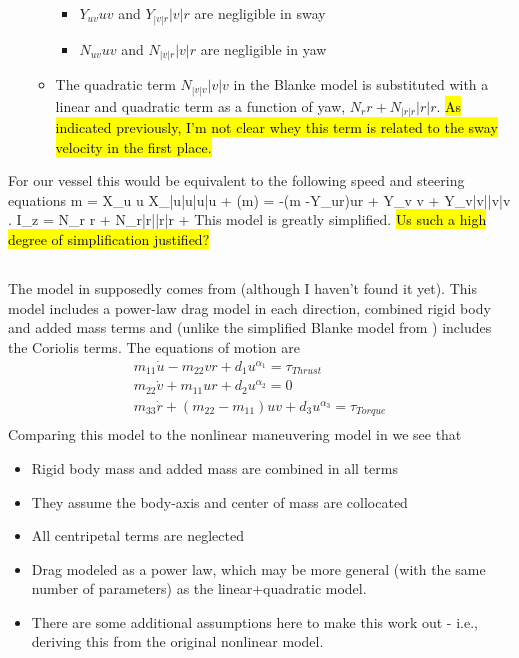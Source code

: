 \documentclass[11pt,draftcls,journal,onecolumn]{../latexlib/latex_ieee/IEEEtran}
\begin{document}
\begin{itemize}
\begin{itemize}
    \begin{itemize}
    \item $Y_{uv}uv$ and $Y_{|v|r}|v|r$ are negligible in sway
    \item $N_{uv}uv$ and $N_{|v|r}|v|r$ are negligible in yaw
    \end{itemize}
   \item The quadratic term $N_{|v|v}|v|v$ in the Blanke model is substituted with a linear and quadratic term as a function of yaw, $N_r r+N_{|r|r}|r|r$. \hl{As indicated previously, I'm not clear whey this term is related to the sway velocity in the first place.}
  \end{itemize}
\end{itemize}
For our vessel this would be equivalent to the following speed and steering equations
\beqn
m = X_u u X_{|u|u}|u|u + \tau
\eeqn
\beqn
(m) 
=
-(m -Y_{ur})ur + Y_v v + Y_{v|v|}|v|v .
\label{e:blanke2v}
\eeqn
\beqn
I_z
=
 N_r r + N_{r|r|}|r|r + \tau
\label{e:blanke2r}
\eeqn
This model is greatly simplified. \hl{Us such a high degree of simplification justified?}

\subsection{\cite{muske08identification}}
The model in \cite{muske08identification} supposedly comes from  \cite{fossen94guidance} (although I haven't found it yet).  This model includes a power-law drag model in each direction, combined rigid body and added mass terms and (unlike the simplified Blanke model from \cite{caccia08practical}) includes the Coriolis terms.  The equations of motion are
\begin{eqnarray}
m_{11}\dot{u} - m_{22}vr + d_1 u^{\alpha_1} = \tau_{Thrust} \\
m_{22}\dot{v} +  m_{11}ur + d_2 u^{\alpha_2} = 0\\
m_{33}\dot{r} + (m_{22}-m_{11})uv + d_3 u^{\alpha_3} = \tau_{Torque} \\
\end{eqnarray}
Comparing this model to the nonlinear maneuvering model in    we see that
\begin{itemize}
\item Rigid body mass and added mass are combined in all terms
\item They assume the body-axis and center of mass are collocated
\item All centripetal terms are neglected
\item Drag modeled as a power law, which may be more general (with the same number of parameters) as the linear+quadratic model.
\item There are some additional assumptions here to make this work out - i.e., deriving this from the original nonlinear model.
\end{itemize}
\end{document}
